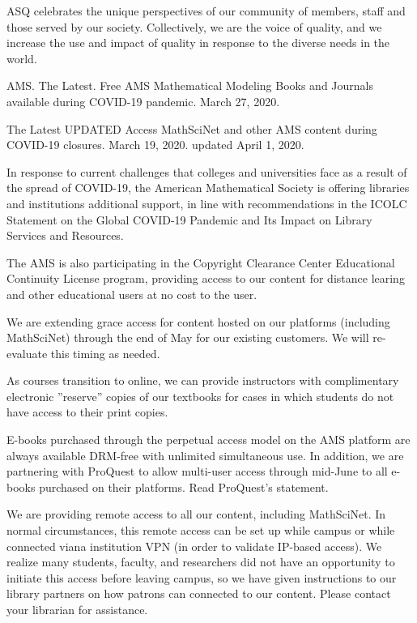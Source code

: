ASQ celebrates the unique perspectives
of our community of members, staff and
those served by our society.
Collectively, we are the voice of
quality, and we increase the use
and impact of quality in response
to the diverse needs in the world.

\fi

AMS.
The Latest. Free AMS Mathematical
Modeling Books and Journals available
during COVID-19 pandemic.
March 27, 2020.

The Latest UPDATED Access MathSciNet
and other AMS content during COVID-19
closures. March 19, 2020.
updated April 1, 2020.

In response to current challenges that
colleges and universities face
as a result of the spread of COVID-19,
the American Mathematical Society is
offering libraries and institutions
additional support,
in line with recommendations in the
ICOLC Statement on the Global COVID-19
Pandemic and Its Impact on Library
Services and Resources.

The AMS is also participating in
the Copyright Clearance Center
Educational Continuity License
program, providing access to our
content for distance learing and
other educational users at no cost to
the user.

We are extending grace access for
content hosted on our platforms
(including MathSciNet) through the
end of May for our existing customers.
We will re-evaluate this timing as
needed.

As courses transition to online,
we can provide instructors with
complimentary electronic ''reserve''
copies of our textbooks for cases
in which students do not have access
to their print copies.

E-books purchased through the perpetual
access model on the AMS platform are
always available DRM-free with
unlimited simultaneous use.
In addition, we are partnering with
ProQuest to allow multi-user access
through mid-June to all e-books
purchased on their platforms.
Read ProQuest's statement.

We are providing remote access to all
our content, including MathSciNet.
In normal circumstances, this remote
access can be set up while campus or
while connected viana institution VPN
(in order to validate IP-based access).
We realize many students, faculty, and
researchers did not have an opportunity
to initiate this access before
leaving campus, so we have given
instructions to our library partners
on how patrons can connected to our
content.
Please contact your librarian for
assistance.

